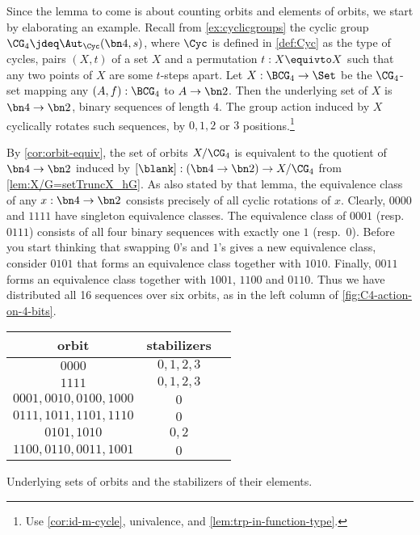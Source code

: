 \begin{example}\label{exa:prep-burnside}
Since the lemma to come is about counting orbits and
elements of orbits, we start by elaborating an example.
Recall from \cref{ex:cyclicgroups} the cyclic group 
$\CG_4 \jdeq\Aut_{\Cyc}(\bn4,s)$, where $\Cyc$ is defined
in \cref{def:Cyc} as the type of cycles, \ie pairs $(X,t)$ of 
a set $X$ and a permutation $t:X\equivto X$ such that any two
points of $X$ are some $t$-steps apart.
Let $X: \BCG_4\to\Set$ be the $\CG_4$-set mapping any $(A,f):\BCG_4$
to $A\to\bn2$. Then the underlying set of $X$ is $\bn4\to\bn2$,
\ie binary sequences of length $4$. The group action induced by $X$
cyclically rotates such sequences, by $0,1,2$ or $3$ positions.\footnote{%
Use \cref{cor:id-m-cycle}, univalence, and \cref{lem:trp-in-function-type}.}

By \cref{cor:orbit-equiv}, the set of orbits $X/\CG_4$ is
equivalent to the quotient of $\bn4\to\bn2$ induced by 
$[\blank] : (\bn4\to\bn2) \to X/\CG_4$ from \cref{lem:X/G=setTruncX_hG}.
As also stated by that lemma, the equivalence class of any $x:\bn4\to\bn2$
consists precisely of all cyclic rotations of $x$. Clearly, 
$0000$ and $1111$ have singleton equivalence classes.
The equivalence class of $0001$ (resp.\ $0111$) consists of all four binary 
sequences with exactly one $1$ (resp.\ $0$).  Before you start thinking that
swapping $0$'s and $1$'s gives a new equivalence class, consider 
$0101$ that forms an equivalence class together with $1010$.
Finally, $0011$ forms an equivalence class together with $1001$,
$1100$ and $0110$. Thus we have distributed all 16 sequences over
six orbits, as in the left column of \cref{fig:C4-action-on-4-bits}.

\begin{margintable}\label{fig:C4-action-on-4-bits}
  \footnotesize
\begin{tabular}{ccc} \toprule
 orbit & stabilizers \\ \midrule
 $0000$ & $0,1,2,3$ \\
 $1111$ & $0,1,2,3$ \\
 $0001,0010,0100,1000$ & $0$ \\
 $0111,1011,1101,1110$ & $0$ \\
 $0101,1010$ & $0,2$ \\
 $1100,0110,0011,1001$ & $0$ \\ \bottomrule
\end{tabular}
\caption{\label{fig:C4-action-on-4-bits}
Underlying sets of orbits and the stabilizers of their elements.}
\end{margintable}


\end{example}

